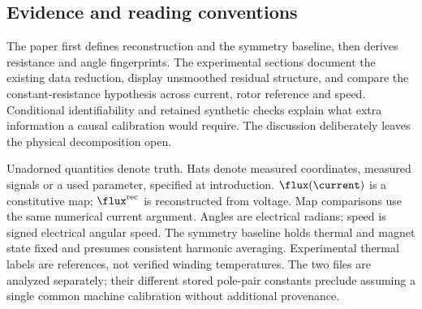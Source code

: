 \subsection{Evidence and reading conventions}
The paper first defines reconstruction and the symmetry baseline, then derives
resistance and angle fingerprints. The experimental sections document the
existing data reduction, display unsmoothed residual structure, and compare
the constant-resistance hypothesis across current, rotor reference and speed.
Conditional identifiability and retained synthetic checks explain what extra
information a causal calibration would require. The discussion deliberately
leaves the physical decomposition open.

Unadorned quantities denote truth. Hats denote measured coordinates, measured
signals or a used parameter, specified at introduction.
$\flux(\current)$ is a constitutive map; $\flux^{\rm rec}$ is reconstructed
from voltage. Map comparisons use the same numerical current argument.
Angles are electrical radians; speed is signed electrical angular speed.
The symmetry baseline holds thermal and magnet state fixed and presumes
consistent harmonic averaging. Experimental thermal labels are references,
not verified winding temperatures. The two files are analyzed separately;
their different stored pole-pair constants preclude assuming a single common
machine calibration without additional provenance.
